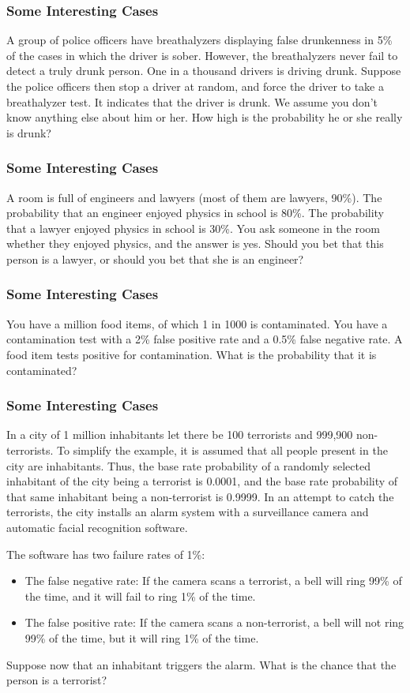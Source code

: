 \documentclass[xcolor=dvipsnames]{beamer}
\begin{document}
\begin{frame}
  \frametitle{Some Interesting Cases}
  A group of police officers have breathalyzers displaying false
  drunkenness in 5\% of the cases in which the driver is sober.
  However, the breathalyzers never fail to detect a truly drunk
  person. One in a thousand drivers is driving drunk. Suppose the
  police officers then stop a driver at random, and force the driver
  to take a breathalyzer test. It indicates that the driver is drunk.
  We assume you don't know anything else about him or her. How high is
  the probability he or she really is drunk?
\end{frame}

\begin{frame}
  \frametitle{Some Interesting Cases}
  A room is full of engineers and lawyers (most of them are lawyers,
  90\%). The probability that an engineer enjoyed physics in school is
  80\%. The probability that a lawyer enjoyed physics in school is
  30\%. You ask someone in the room whether they enjoyed physics, and
  the answer is yes. Should you bet that this person is a lawyer, or
  should you bet that she is an engineer?
\end{frame}

\begin{frame}
  \frametitle{Some Interesting Cases}
You have a million food items, of which 1 in 1000 is contaminated. You
have a contamination test with a 2\% false positive rate and a 0.5\%
false negative rate. A food item tests positive for contamination.
What is the probability that it is contaminated?
\end{frame}

\begin{frame}
  \frametitle{Some Interesting Cases}
  In a city of 1 million inhabitants let there be 100 terrorists and
  999,900 non-terrorists. To simplify the example, it is assumed that
  all people present in the city are inhabitants. Thus, the base rate
  probability of a randomly selected inhabitant of the city being a
  terrorist is 0.0001, and the base rate probability of that same
  inhabitant being a non-terrorist is 0.9999. In an attempt to catch
  the terrorists, the city installs an alarm system with a
  surveillance camera and automatic facial recognition software.

The software has two failure rates of 1\%:
\begin{itemize}
\item The false negative rate: If the camera scans a terrorist, a bell
  will ring 99\% of the time, and it will fail to ring 1\% of the
  time.
\item The false positive rate: If the camera scans a non-terrorist, a
  bell will not ring 99\% of the time, but it will ring 1\% of the
  time.
\end{itemize}

Suppose now that an inhabitant triggers the alarm. What is the chance
that the person is a terrorist?
\end{frame}
\end{document}
